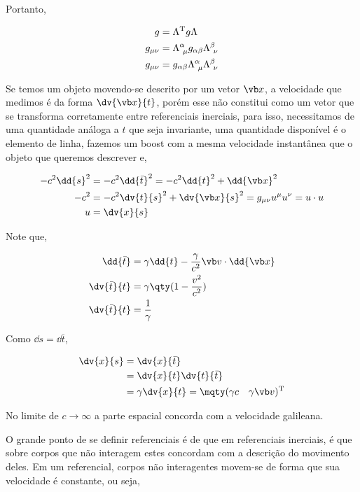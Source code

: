 \documentclass[twoside]{amsart}
\numberwithin{equation}{section}
\begin{document}
Portanto,

\begin{align}
    g&=\Lambda^{\textup T}g\Lambda\\
    g_{\mu\nu}&=\Lambda^\alpha_{\ \mu}g_{\alpha\beta}\Lambda^\beta_{\ \nu}\\
    g_{\mu\nu}&=g_{\alpha\beta}\Lambda^\alpha_{\ \mu}\Lambda^\beta_{\ \nu}
\end{align}

Se temos um objeto movendo-se descrito por um vetor $\vb x$, a velocidade que medimos é da forma $\dv{\vb x}{t}$, porém esse não constitui como um vetor que se transforma corretamente entre referenciais inerciais, para isso, necessitamos de uma quantidade análoga a $t$ que seja invariante, uma quantidade disponível é o elemento de linha, fazemos um boost com a mesma velocidade instantânea que o objeto que queremos descrever e,

\begin{align}
    -c^2\dd{s}^2&=-c^2\dd{{\bar t}}^2=-c^2\dd{t}^2+\dd{\vb x}^2\\
    -c^2&=-c^2\dv{t}{s}^2+\dv{\vb x}{s}^2=g_{\mu\nu}u^\mu u^\nu=u\cdot u\\
    u&=\dv{x}{s}
\end{align}

Note que,

\begin{align}
    \dd{{\bar t}}&=\gamma\dd{t}-\frac{\gamma}{c^2}\vb v\cdot \dd{\vb x}\\
    \dv{{\bar t}}{t}&=\gamma\qty(1-\frac{v^2}{c^2})\\
    \dv{{\bar t}}{t}&=\frac{1}{\gamma}
\end{align}

Como $\dd{s}=\dd{{\bar t}}$,

\begin{align}
    \dv{x}{s}&=\dv{x}{{\bar t}}\\
    &=\dv{x}{t}\dv{t}{{\bar t}}\\
    &=\gamma \dv{x}{t}=\mqty(\gamma c&\gamma\vb v)^{\textup T}
\end{align}

No limite de $c\rightarrow \infty$ a parte espacial concorda com a velocidade galileana.

O grande ponto de se definir referenciais é de que em referenciais inerciais, é que sobre corpos que não interagem estes concordam com a descrição do movimento deles. Em um referencial, corpos não interagentes movem-se de forma que sua velocidade é constante, ou seja,
\end{document}
